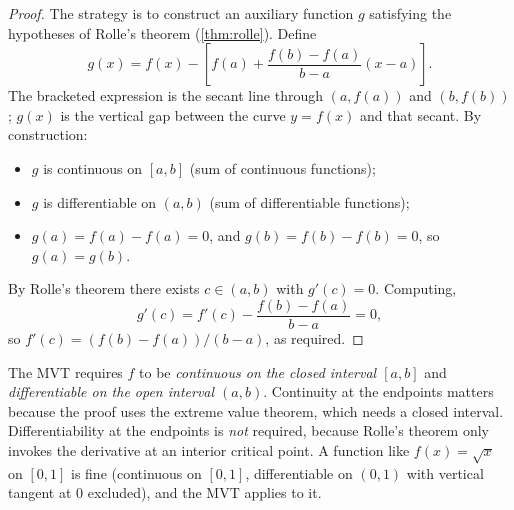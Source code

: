 \begin{proof}
The strategy is to construct an auxiliary function \(g\) satisfying the hypotheses of Rolle's theorem (\cref{thm:rolle}). Define
\[
g(x) = f(x) - \left[f(a) + \frac{f(b) - f(a)}{b - a}(x - a)\right].
\]
The bracketed expression is the secant line through \((a, f(a))\) and \((b, f(b))\); \(g(x)\) is the vertical gap between the curve \(y = f(x)\) and that secant. By construction:
\begin{itemize}
    \item \(g\) is continuous on \([a, b]\) (sum of continuous functions);
    \item \(g\) is differentiable on \((a, b)\) (sum of differentiable functions);
    \item \(g(a) = f(a) - f(a) = 0\), and \(g(b) = f(b) - f(b) = 0\), so \(g(a) = g(b)\).
\end{itemize}
By Rolle's theorem there exists \(c \in (a, b)\) with \(g'(c) = 0\). Computing,
\[
g'(c) = f'(c) - \frac{f(b) - f(a)}{b - a} = 0,
\]
so \(f'(c) = (f(b) - f(a))/(b - a)\), as required.
\end{proof}

\begin{caution}
The MVT requires \(f\) to be \emph{continuous on the closed interval \([a, b]\)} and \emph{differentiable on the open interval \((a, b)\)}. Continuity at the endpoints matters because the proof uses the extreme value theorem, which needs a closed interval. Differentiability at the endpoints is \emph{not} required, because Rolle's theorem only invokes the derivative at an interior critical point. A function like \(f(x) = \sqrt{x}\) on \([0, 1]\) is fine (continuous on \([0, 1]\), differentiable on \((0, 1)\) with vertical tangent at \(0\) excluded), and the MVT applies to it.
\end{caution}

